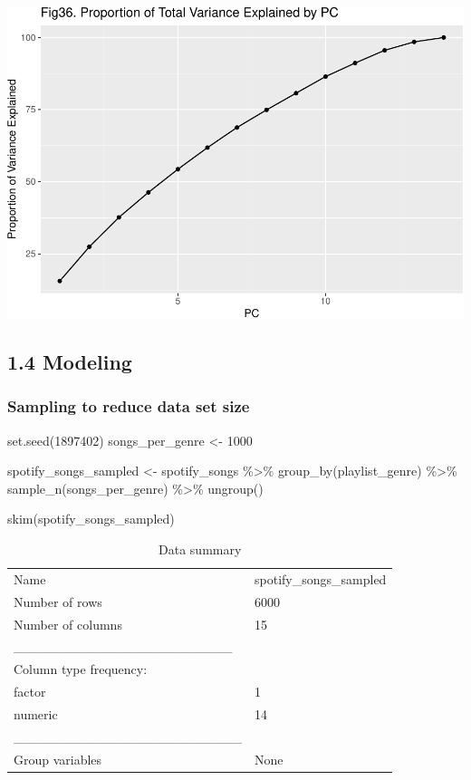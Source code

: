 \documentclass[
]{article}
\newenvironment{Shaded}{\begin{snugshade}}{\end{snugshade}}
\newcommand{\DecValTok}[1]{\textcolor[rgb]{0.00,0.00,0.81}{#1}}
\newcommand{\FunctionTok}[1]{\textcolor[rgb]{0.00,0.00,0.00}{#1}}
\newcommand{\NormalTok}[1]{#1}
\newcommand{\OtherTok}[1]{\textcolor[rgb]{0.56,0.35,0.01}{#1}}
\newcommand{\SpecialCharTok}[1]{\textcolor[rgb]{0.00,0.00,0.00}{#1}}
\begin{document}
\includegraphics{Final-Report_files/figure-latex/unnamed-chunk-20-1.pdf}

\hypertarget{modeling}{%
\subsection{1.4 Modeling}\label{modeling}}

\hypertarget{sampling-to-reduce-data-set-size}{%
\subsubsection{Sampling to reduce data set
size}\label{sampling-to-reduce-data-set-size}}

\begin{Shaded}
\begin{Highlighting}[]
\FunctionTok{set.seed}\NormalTok{(}\DecValTok{1897402}\NormalTok{)}
\NormalTok{songs\_per\_genre }\OtherTok{\textless{}{-}} \DecValTok{1000}

\NormalTok{spotify\_songs\_sampled  }\OtherTok{\textless{}{-}}\NormalTok{ spotify\_songs }\SpecialCharTok{\%\textgreater{}\%}
  \FunctionTok{group\_by}\NormalTok{(playlist\_genre) }\SpecialCharTok{\%\textgreater{}\%}
  \FunctionTok{sample\_n}\NormalTok{(songs\_per\_genre) }\SpecialCharTok{\%\textgreater{}\%}
  \FunctionTok{ungroup}\NormalTok{()}

\FunctionTok{skim}\NormalTok{(spotify\_songs\_sampled)}
\end{Highlighting}
\end{Shaded}

\begin{longtable}[]{@{}ll@{}}
\caption{Data summary}\tabularnewline
\toprule()
\endhead
Name & spotify\_songs\_sampled \\
Number of rows & 6000 \\
Number of columns & 15 \\
\_\_\_\_\_\_\_\_\_\_\_\_\_\_\_\_\_\_\_\_\_\_\_ & \\
Column type frequency: & \\
factor & 1 \\
numeric & 14 \\
\_\_\_\_\_\_\_\_\_\_\_\_\_\_\_\_\_\_\_\_\_\_\_\_ & \\
Group variables & None \\
\bottomrule()
\end{longtable}
\end{document}
